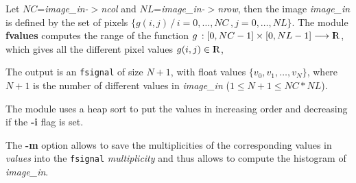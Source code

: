 Let $NC$={\em image\_in-$>$ncol} and $NL$={\em image\_in-$>$nrow}, then
the image {\em image\_in} is defined by the set of pixels
$\{ g(i,j)\, /\, i=0, \ldots, NC\, , j=0, \ldots, NL\}$.
The module {\bf fvalues} computes the range of the function 
$g\,: [0,NC-1]\times[0,NL-1]\longrightarrow {\rm I\!\!R}$, which
gives all the different pixel values $g(i,j)\in{\rm I\!\!R}$,

\smallskip

The output is an {\tt fsignal} of size $N+1$, with float values 
$\{v_0, v_1, \ldots, v_N\}$, where $N+1$ is the number of different
values in {\em image\_in} ($1\leq N+1\leq NC*NL$).

\smallskip

The module uses a heap sort to put the values in increasing order
and decreasing if the {\bf -i} flag is set.

\smallskip

The {\bf -m} option allows to save the multiplicities of the 
corresponding values in {\em values} into the {\tt fsignal} 
{\em multiplicity} and thus allows to compute the histogram
of {\em image\_in}.
